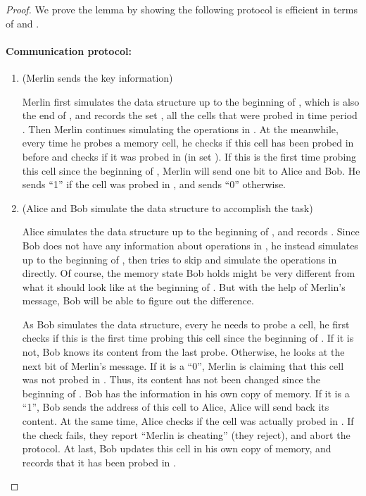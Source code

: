 \documentclass[11pt]{article}
\begin{document}
\begin{proof}

We prove the lemma by showing the following protocol is efficient in terms of  and . 

\paragraph*{Communication protocol:}

\begin{enumerate}[Step 1:]
	\setcounter{enumi}{0}
	\item
		(Merlin sends the key information)
		
		Merlin first simulates the data structure up to the beginning of , which is also the end of , and records the set , all the cells that were probed in time period . Then Merlin continues simulating the operations in . At the meanwhile, every time he probes a memory cell, he checks if this cell has been probed in  before and checks if it was probed in  (in set ). If this is the first time probing this cell since the beginning of , Merlin will send one bit to Alice and Bob. He sends ``1'' if the cell was probed in , and sends ``0'' otherwise.
		
\item
		(Alice and Bob simulate the data structure to accomplish the task)
		
		Alice simulates the data structure up to the beginning of , and records . Since Bob does not have any information about operations in , he instead simulates up to the beginning of , then tries to skip  and simulate the operations in  directly. Of course, the memory state Bob holds might be very different from what it should look like at the beginning of . But with the help of Merlin's message, Bob will be able to figure out the difference. 
		
		As Bob simulates the data structure, every he needs to probe a cell, he first checks if this is the first time probing this cell since the beginning of . If it is not, Bob knows its content from the last probe. Otherwise, he looks at the next bit of Merlin's message. If it is a ``0'', Merlin is claiming that this cell was not probed in . Thus, its content has not been changed since the beginning of . Bob has the information in his own copy of memory. If it is a ``1'', Bob sends the address of this cell to Alice, Alice will send back its content. At the same time, Alice checks if the cell was actually probed in . If the check fails, they report ``Merlin is cheating'' (they reject), and abort the protocol. At last, Bob updates this cell in his own copy of memory, and records that it has been probed in . 
		

\end{enumerate}
\end{proof}
\end{document}
